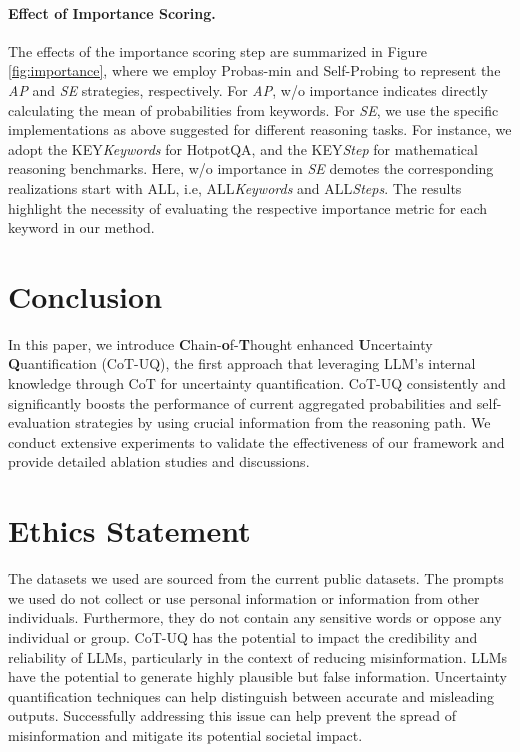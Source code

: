 \documentclass[11pt]{article}
\begin{document}
\paragraph{Effect of Importance Scoring.}
The effects of the importance scoring step are summarized in Figure \ref{fig:importance}, where we employ Probas-min and Self-Probing to represent the \textit{AP} and \textit{SE} strategies, respectively.
For \textit{AP}, w/o importance indicates directly calculating the mean of probabilities from keywords.
For \textit{SE},  we use the specific implementations as above suggested for different reasoning tasks. For instance, we adopt the {\small KEY}\textit{Keywords} for HotpotQA, and the {\small KEY}\textit{Step} for mathematical reasoning benchmarks.
Here, w/o importance in \textit{SE} demotes the corresponding realizations start with {\small ALL}, i.e, {\small ALL}\textit{Keywords} and {\small ALL}\textit{Steps}.
The results highlight the necessity of evaluating the respective importance metric for each keyword in our method.

\section{Conclusion}
In this paper, we introduce \textbf{C}hain-\textbf{o}f-\textbf{T}hought enhanced \textbf{U}ncertainty \textbf{Q}uantification (CoT-UQ), the first approach that leveraging LLM's internal knowledge through CoT for uncertainty quantification. CoT-UQ consistently and significantly boosts the performance of current aggregated probabilities and self-evaluation strategies by using crucial information from the reasoning path.
We conduct extensive experiments to validate the effectiveness of our framework and provide detailed ablation studies and discussions.

\section*{Ethics Statement}
The datasets we used are sourced from the current public datasets. The prompts we used do not collect or use personal information or information from other individuals. Furthermore, they do not contain any sensitive words or oppose any individual or group.
CoT-UQ has the potential to impact the credibility and reliability of LLMs, particularly in the context of reducing misinformation. LLMs have the potential to generate highly plausible but false information. Uncertainty quantification techniques can help distinguish between accurate and misleading outputs. Successfully addressing this issue can help prevent the spread of misinformation and mitigate its potential societal impact.
\end{document}
